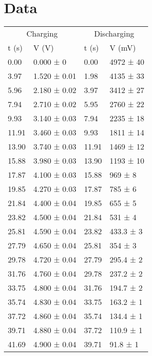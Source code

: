 \documentclass{article}
\begin{document}
\section*{Data}
\begin{table}[]
	\begin{tabular}{@{}ll|ll@{}}
		\toprule
		\multicolumn{2}{c|}{Charging} & \multicolumn{2}{c}{Discharging} \\
		t (s)  & V (V)        & t (s)        & V (mV)           \\ \midrule
		0.00   & 0.000 ± 0    & 0.00         & 4972 ± 40        \\
		3.97   & 1.520 ± 0.01 & 1.98         & 4135 ± 33        \\
		5.96   & 2.180 ± 0.02 & 3.97         & 3412 ± 27        \\
		7.94   & 2.710 ± 0.02 & 5.95         & 2760 ± 22        \\
		9.93   & 3.140 ± 0.03 & 7.94         & 2235 ± 18        \\
		11.91  & 3.460 ± 0.03 & 9.93         & 1811 ± 14        \\
		13.90  & 3.740 ± 0.03 & 11.91        & 1469 ± 12        \\
		15.88  & 3.980 ± 0.03 & 13.90        & 1193 ± 10        \\
		17.87  & 4.100 ± 0.03 & 15.88        & 969 ± 8          \\
		19.85  & 4.270 ± 0.03 & 17.87        & 785 ± 6          \\
		21.84  & 4.400 ± 0.04 & 19.85        & 655 ± 5          \\
		23.82  & 4.500 ± 0.04 & 21.84        & 531 ± 4          \\
		25.81  & 4.590 ± 0.04 & 23.82        & 433.3 ± 3        \\
		27.79  & 4.650 ± 0.04 & 25.81        & 354 ± 3          \\
		29.78  & 4.720 ± 0.04 & 27.79        & 295.4 ± 2        \\
		31.76  & 4.760 ± 0.04 & 29.78        & 237.2 ± 2        \\
		33.75  & 4.800 ± 0.04 & 31.76        & 194.7 ± 2        \\
		35.74  & 4.830 ± 0.04 & 33.75        & 163.2 ± 1        \\
		37.72  & 4.860 ± 0.04 & 35.74        & 134.4 ± 1        \\
		39.71  & 4.880 ± 0.04 & 37.72        & 110.9 ± 1        \\
		41.69  & 4.900 ± 0.04 & 39.71        & 91.8 ± 1         \\

\end{tabular}
\end{table}
\end{document}
